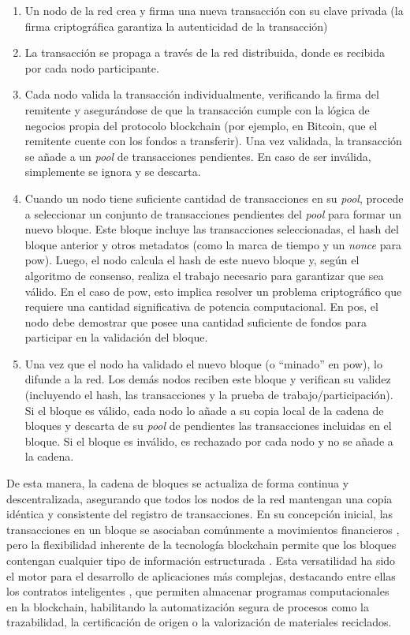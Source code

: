 \begin{enumerate}
    \item Un nodo de la red crea y firma una nueva transacción con su clave privada (la firma criptográfica garantiza la autenticidad de la transacción)
    \item La transacción se propaga a través de la red distribuida, donde es recibida por cada nodo participante.
    \item Cada nodo valida la transacción individualmente, verificando la firma del remitente y asegurándose de que la transacción cumple con la lógica de negocios propia del protocolo blockchain (por ejemplo, en Bitcoin, que el remitente cuente con los fondos a transferir). Una vez validada, la transacción se añade a un \textit{pool} de transacciones pendientes. En caso de ser inválida, simplemente se ignora y se descarta. 
    \item Cuando un nodo tiene suficiente cantidad de transacciones en su \textit{pool}, procede a seleccionar un conjunto de transacciones pendientes del \textit{pool} para formar un nuevo bloque. Este bloque incluye las transacciones seleccionadas, el hash del bloque anterior y otros metadatos (como la marca de tiempo y un \textit{nonce} para \acrshort{pow}). Luego, el nodo calcula el hash de este nuevo bloque y, según el algoritmo de consenso, realiza el trabajo necesario para garantizar que sea válido. En el caso de \acrshort{pow}, esto implica resolver un problema criptográfico que requiere una cantidad significativa de potencia computacional. En \acrshort{pos}, el nodo debe demostrar que posee una cantidad suficiente de fondos para participar en la validación del bloque.
    \item Una vez que el nodo ha validado el nuevo bloque (o ``minado'' en \acrshort{pow}), lo difunde a la red. Los demás nodos reciben este bloque y verifican su validez (incluyendo el hash, las transacciones y la prueba de trabajo/participación). Si el bloque es válido, cada nodo lo añade a su copia local de la cadena de bloques y descarta de su \textit{pool} de pendientes las transacciones incluidas en el bloque. Si el bloque es inválido, es rechazado por cada nodo y no se añade a la cadena.
\end{enumerate}

De esta manera, la cadena de bloques se actualiza de forma continua y descentralizada, asegurando que todos los nodos de la red mantengan una copia idéntica y consistente del registro de transacciones. En su concepción inicial, las transacciones en un bloque se asociaban comúnmente a movimientos financieros \cite{satoshi2008bitcoin}, pero la flexibilidad inherente de la tecnología blockchain permite que los bloques contengan cualquier tipo de información estructurada \cite{bartolomeo2020introduccion}. Esta versatilidad ha sido el motor para el desarrollo de aplicaciones más complejas, destacando entre ellas los contratos inteligentes \cite{sunny2022systematic}, que permiten almacenar programas computacionales en la blockchain, habilitando la automatización segura de procesos como la trazabilidad, la certificación de origen o la valorización de materiales reciclados.

